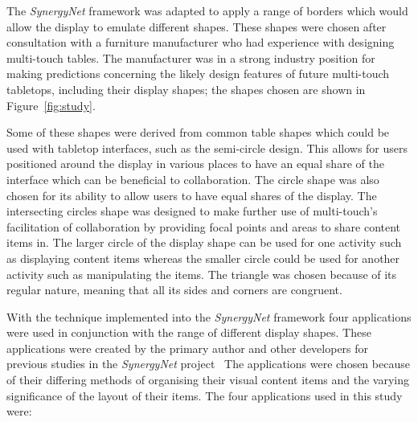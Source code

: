 \documentclass{bmcart}
\begin{document}

The {\emph{SynergyNet}} framework was adapted to apply a range of borders which would allow the display to emulate different shapes.
These shapes were chosen after consultation with a furniture manufacturer who had experience with designing multi-touch tables.
The manufacturer was in a strong industry position for making
predictions concerning the likely design features of future multi-touch tabletops, including their display shapes; the shapes chosen are shown in Figure~\ref{fig:study}.

Some of these shapes were derived from common table shapes which could be used with tabletop interfaces, such as the semi-circle design.
This allows for users positioned around the display in various places to have an equal share of the interface which can be beneficial to collaboration.
The circle shape was also chosen for its ability to allow users to have equal shares of the display.
The intersecting circles shape was designed to make further use of multi-touch's facilitation of collaboration by providing focal points and areas to share content items in.
The larger circle of the display shape can be used for one activity such as displaying content items whereas the smaller circle could be used for another activity such as manipulating the items.
The triangle was chosen because of its regular nature, meaning that all its sides and corners are congruent.

With the technique implemented into the {\emph{SynergyNet}} framework four applications were used in conjunction with the range of different display shapes.
These applications were created by the primary author and other developers for previous studies in the {\emph{SynergyNet}} project~\cite{higgins2011}
The applications were chosen because of their differing methods of organising their visual content items and the varying significance of the layout of their items.
The four applications used in this study were:
\end{document}
